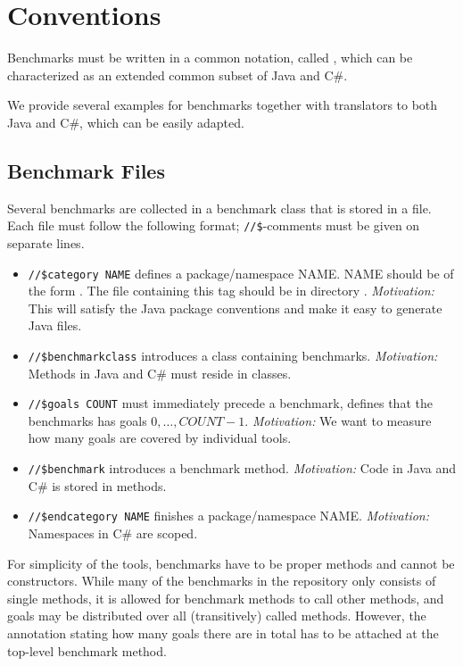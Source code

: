 \section{Conventions}

Benchmarks must be written in a common notation, called ,
which can be characterized as an extended common subset of Java and C\#.

We provide several examples for  benchmarks together with translators to both Java and C\#, 
which can be easily adapted.

\subsection{Benchmark Files}

Several benchmarks are collected in a benchmark class that is stored in a file.
Each file must follow the following format;
{\tt //\$}-comments must be given on separate lines.

\begin{itemize}
\item {\tt //\$category NAME} defines a package/namespace NAME. NAME should be of the form . The file containing this tag should be in directory .
{\it Motivation:} This will satisfy the Java package conventions and make it easy to generate Java files. 
\item {\tt //\$benchmarkclass} introduces a class containing benchmarks.
{\it Motivation:} Methods in Java and C\# must reside in classes.
\item {\tt //\$goals COUNT} must immediately precede a benchmark, defines that the benchmarks has goals $0, \ldots, COUNT-1$.
{\it Motivation:} We want to measure how many goals are covered by individual tools.
\item {\tt //\$benchmark} introduces a benchmark method.
{\it Motivation:} Code in Java and C\# is stored in methods.
\item {\tt //\$endcategory NAME} finishes a package/namespace NAME.
{\it Motivation:} Namespaces in C\# are scoped.
\end{itemize}

For simplicity of the tools, benchmarks have to be proper methods and cannot be constructors.
While many of the benchmarks in the repository only consists of single methods,
it is allowed for benchmark methods to call other methods,
and goals may be distributed over all (transitively) called methods.
However, the annotation stating how many goals there are in total has to be attached at the top-level benchmark method.

